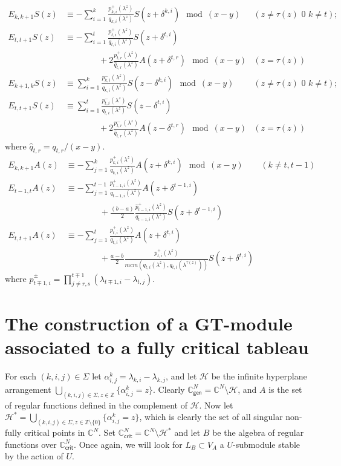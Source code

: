 \documentclass[11pt,fleqn]{article}
\newcommand\CC{\mathbb C}
\newcommand\ZZ{\mathbb Z}
\renewcommand\H{\mathcal H}
\newcommand\gen{\mathsf{gen}}
\newcommand\crit{\mathsf{crit}}
\begin{document}
\begin{align*}
E_{k,k+1} S(z)
	&\equiv -\sum_{i=1}^k \frac{p_{k,i}^+(\lambda^z)}{q_{k,i}(\lambda^z)} 
	S(z+\delta^{k,i}) \mod (x-y) &(z \neq \tau(z) \mbox{ 0 } k \neq t); \\
E_{t,t+1} S(z)
	&\equiv -\sum_{i=1}^t \frac{p_{t,i}^+(\lambda^z)}{q_{t,i}(\lambda^z)} 
	S(z+\delta^{t,i}) \\&\qquad \qquad + 2\frac{p^+_{t,r}(\lambda^z)}{\hat q_{t,r}(\lambda^z)} A(z+\delta^{t,r}) \mod (x-y) &(z = \tau(z)) \\
E_{k+1,k} S(z)
	&\equiv \sum_{i=1}^k \frac{p_{k,i}^-(\lambda^z)}{q_{k,i}(\lambda^z)} 
	S(z-\delta^{k,i}) \mod (x-y) &(z \neq \tau(z) \mbox{ 0 } k \neq t); \\
E_{t,t+1} S(z)
	&\equiv \sum_{i=1}^t \frac{p_{t,i}^-(\lambda^z)}{q_{t,i}(\lambda^z)} 
	S(z-\delta^{t,i}) \\&\qquad \qquad + 2\frac{p^-_{t,r}(\lambda^z)}{\hat q_{t,r}(\lambda^z)} A(z-\delta^{t,r}) \mod (x-y) &(z = \tau(z))
\end{align*}
where $\hat q_{t,r} = q_{t,r}/(x-y)$.
\begin{align*}
E_{k,k+1} A(z)
	&\equiv -\sum_{j=1}^k \frac{p_{k,i}^+(\lambda^z)}{q_{k,i}(\lambda^z)}
	A(z+\delta^{k,i}) \mod (x-y)&(k \neq t,t-1) \\
E_{t-1,t} A(z) 
	&\equiv -\sum_{j=1}^{t-1} \frac{p_{t-1,i}^+(\lambda^z)}
	{q_{t-1,i}(\lambda^z)} A(z+\delta^{t-1,i}) \\
	&\qquad \qquad + \frac{(b-a)}{2}\frac{\hat p^+_{t-1,i}(\lambda^z)}
	{q_{t-1,i}(\lambda^z)} S(z + \delta^{t-1,i})\\
E_{t,t+1} A(z)
	&\equiv -\sum_{j=1}^{t} \frac{p_{t,i}^+(\lambda^z)}
	{q_{t,i}(\lambda^z)} A(z+\delta^{t,i}) \\
	&\qquad \qquad + \frac{a-b}{2} \frac{p_{t,i}^+(\lambda^z)}
	{mcm(q_{t,i}(\lambda^z),q_{t,i}(\lambda^{\tau(z)}))} S(z + \delta^{t,i})
\end{align*}
where $\displaystyle \hat p_{t \mp 1,i}^\pm = \prod_{j \neq r,s}^{t\mp 1} 
(\lambda_{t\mp 1, i} - \lambda_{t,j})$.

\newpage

\section{The construction of a GT-module associated to a fully critical 
tableau}
For each $(k,i,j) \in \Sigma$ let $\alpha^k_{i,j} = \lambda_{k,i} - 
\lambda_{k,j}$, and let $\mathcal H$ be the infinite hyperplane arrangement
$\bigcup_{(k,i,j) \in \Sigma, z \in \ZZ} \{\alpha_{i,j}^k = z\}$. Clearly
$\CC^N_\gen = \CC^N \setminus \H$, and $A$ is the set of regular functions
defined in the complement of $\H$. Now let $\H^* = \bigcup_{(k,i,j) \in 
\Sigma, z \in \ZZ\setminus \{0\}} \{\alpha_{i,j}^k = z\}$, which is clearly
the set of all singular non-fully critical points in $\CC^N$. Set $\CC^N_\crit
= \CC^N \setminus \H^*$ and let $B$ be the algebra of regular functions over
$\CC^N_\crit$. Once again, we will look for $L_B \subset V_A$ a $U$-submodule
stable by the action of $U$.
\end{document}
